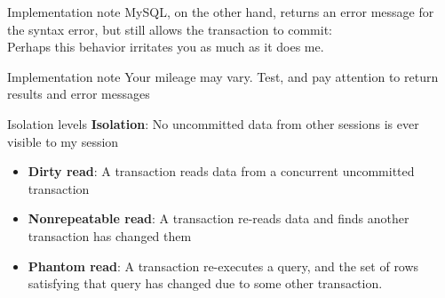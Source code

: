 \documentclass[svgnames]{beamer}
\begin{document}
\begin{frame}{Implementation note}
    MySQL, on the other hand, returns an error message for the syntax error,
    but still allows the transaction to commit: \\
    \vspace{10pt}
    \small {
    }
    \vspace{10pt}
    \pause
    Perhaps this behavior irritates you as much as it does me.
\end{frame}

\begin{frame}{Implementation note}
    Your mileage may vary. Test, and pay attention to return results and error
    messages
\end{frame}

\begin{frame}{Isolation levels}
    \textbf{Isolation}: No uncommitted data from other sessions is ever visible to my session
    \begin{itemize}
        \item \textbf{Dirty read}: A transaction reads data from a
        concurrent uncommitted transaction
        \item \textbf{Nonrepeatable read}: A transaction re-reads data and
        finds another transaction has changed them
        \item \textbf{Phantom read}: A transaction re-executes a query, and
        the set of rows satisfying that query has changed due to some other
        transaction.
    \end{itemize}
\end{frame}
\end{document}
